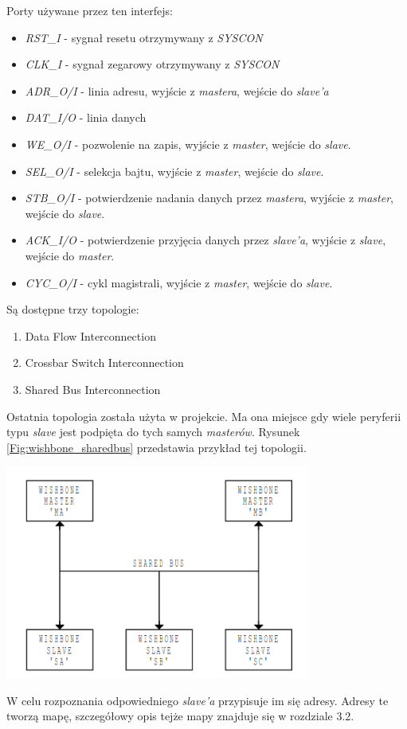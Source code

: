 \documentclass[11pt,a4paper]{article}
\begin{document}
			Porty używane przez ten interfejs\cite{wishbone_tutorial}:
			\begin{itemize}
				\item \textit{RST\_I} - sygnał resetu otrzymywany z \textit{SYSCON}
				\item \textit{CLK\_I} - sygnał zegarowy otrzymywany z \textit{SYSCON}
				\item \textit{ADR\_O/I} - linia adresu, wyjście z \textit{mastera}, wejście do \textit{slave'a}
				\item \textit{DAT\_I/O} - linia danych 
				\item \textit{WE\_O/I} - pozwolenie na zapis, wyjście z \textit{master}, wejście do \textit{slave}.
				\item \textit{SEL\_O/I} - selekcja bajtu, wyjście z \textit{master}, wejście do \textit{slave}.
				\item \textit{STB\_O/I} - potwierdzenie nadania danych przez \textit{mastera}, wyjście z \textit{master}, wejście do \textit{slave}.
				\item \textit{ACK\_I/O} - potwierdzenie przyjęcia danych przez \textit{slave'a}, wyjście z \textit{slave}, wejście do \textit{master}.
				\item \textit{CYC\_O/I} - cykl magistrali, wyjście z \textit{master}, wejście do \textit{slave}.
			\end{itemize}
			
		Są dostępne trzy topologie:
			\begin{enumerate}
				\item Data Flow Interconnection
				\item Crossbar Switch Interconnection
				\item Shared Bus Interconnection
			\end{enumerate}
			Ostatnia topologia została użyta w projekcie. Ma ona miejsce gdy wiele peryferii typu \textit{slave} jest podpięta do tych samych \textit{masterów}. Rysunek \ref{Fig:wishbone_sharedbus} przedstawia przykład tej topologii.
			\begin{samepage}
				\nopagebreak
				\begin{center}
					\includegraphics[width=10cm]{./rysunki/wishbone_sharedbus.png}
				\end{center}
			\end{samepage}
		W celu rozpoznania odpowiedniego \textit{slave'a} przypisuje im się adresy. Adresy te tworzą mapę, szczegółowy opis tejże mapy znajduje się w rozdziale 3.2.
\end{document}
